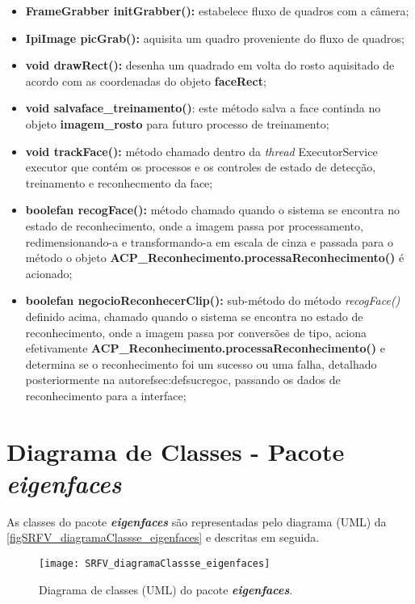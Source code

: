 \begin{itemize}
\begin{itemize}
		\item \textbf{FrameGrabber initGrabber():} estabelece fluxo de quadros com a câmera;
		
		\item \textbf{IpiImage picGrab():} aquisita um quadro proveniente do fluxo de quadros;
		
		\item \textbf{void drawRect():} desenha um quadrado em volta do rosto aquisitado de acordo com as coordenadas do objeto \textbf{faceRect};
		
		\item \textbf{void salvaface\_treinamento()}: este método salva a face continda no objeto \textbf{imagem\_rosto} para futuro processo de treinamento;
		
		\item \textbf{void trackFace():} método chamado dentro da \textit{thread} ExecutorService executor que contém os processos e os controles de estado de detecção, treinamento e reconhecmento da face;
		
		\item \textbf{boolefan recogFace():} método chamado quando o sistema se encontra no estado de reconhecimento, onde a imagem passa por processamento, redimensionando-a e transformando-a em escala de cinza e passada para o método o objeto \textbf{ACP\_Reconhecimento.processaReconhecimento()} é acionado;
		
		\item \textbf{boolefan negocioReconhecerClip():} sub-método do método \textit{recogFace()} definido acima, chamado quando o sistema se encontra no estado de reconhecimento, onde a imagem passa por conversões de tipo,  aciona efetivamente \textbf{ACP\_Reconhecimento.processaReconhecimento()} e determina se o reconhecimento foi um sucesso ou uma falha, detalhado posteriormente na autoref{sec:defsucregoc}, passando os dados de reconhecimento para a interface;
	\end{itemize}
\end{itemize}

\section{Diagrama de Classes - Pacote \textit{\textbf{eigenfaces}}}\label{sec:eigenfacesclass}
As classes do pacote \textbf{\textit{eigenfaces}} são representadas pelo diagrama (UML) da \autoref{figSRFV_diagramaClassse_eigenfaces} e descritas em seguida. 

\begin{figure}[h]
	\centering
	\texttt{[image: SRFV\_diagramaClassse\_eigenfaces]}
	\caption{Diagrama de classes (UML) do pacote \textbf{\textit{eigenfaces}}.}
	\label{figSRFV_diagramaClassse_eigenfaces}
\end{figure}

